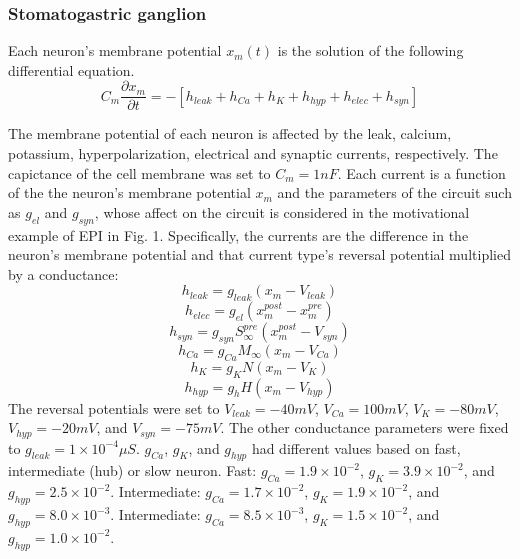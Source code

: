 \documentclass[11pt]{article}
\begin{document}
\subsubsection{Stomatogastric ganglion}\label{methods_STG}
Each neuron's membrane potential $x_m(t)$ is the solution of the following differential equation.
\begin{equation} C_m \frac{\partial x_m}{\partial t} = - \left[ h_{leak} + h_{Ca} + h_K + h_{hyp} + h_{elec} + h_{syn}\right] 
\end{equation} 

The membrane potential of each neuron is affected by the leak, calcium, potassium, hyperpolarization,
electrical and synaptic currents, respectively.  The capictance of the cell membrane was set to $C_m = 1nF$. Each current is a function of the the neuron's membrane potential $x_m$ and the parameters of the circuit such as  $g_{el}$ and $g_{syn}$, whose affect on the circuit is considered in the motivational example of EPI in Fig. 1.  Specifically, the currents are the difference in the neuron's membrane potential and that current type's reversal potential multiplied by a conductance:
\begin{equation}  h_{leak} = g_{leak} (x_m - V_{leak}) 
\end{equation} 
\begin{equation}  h_{elec} = g_{el} (x_m^{post} - x_m^{pre})
\end{equation} 
\begin{equation}  h_{syn} = g_{syn} S_\infty^{pre} (x_m^{post} - V_{syn}) \end{equation} 
\begin{equation}  h_{Ca} = g_{Ca} M_\infty (x_m - V_{Ca}) 
\end{equation} 
\begin{equation}  h_K = g_K N (x_m - V_K) 
\end{equation} 
\begin{equation}  h_{hyp} = g_h H(x_m - V_{hyp})
\end{equation} 
The reversal potentials were set to $V_{leak} = -40mV$, $V_{Ca} = 100mV$, $V_K = -80mV$, $V_{hyp} = -20mV$, and $V_{syn} = -75mV$.  The other conductance parameters were fixed to $g_{leak} = 1 \times 10^{-4} \mu S$. $g_{Ca}$, $g_{K}$, and $g_{hyp}$ had different values based on fast, intermediate (hub) or slow neuron.  Fast: $g_{Ca} = 1.9 \times 10^{-2}$, $ g_K = 3.9 \times 10^{-2} $, and $ g_{hyp} = 2.5 \times 10^{-2} $.  Intermediate: $g_{Ca} = 1.7 \times 10^{-2}$, $ g_K = 1.9 \times 10^{-2} $, and $ g_{hyp} = 8.0 \times 10^{-3} $.  Intermediate: $g_{Ca} = 8.5 \times 10^{-3}$, $ g_K = 1.5 \times 10^{-2} $, and $ g_{hyp} = 1.0 \times 10^{-2} $.
\end{document}
